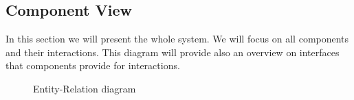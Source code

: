 \documentclass[12pt,titlepage]{article}
\begin{document}
\subsection{Component View}
In this section we will present the whole system. We will focus on all components and their interactions. This diagram will provide also an overview on interfaces that components provide for interactions.
\begin{figure}[H]
\centering
{}
\caption{Entity-Relation diagram}
\end{figure}

\clearpage
\newpage
\end{document}
